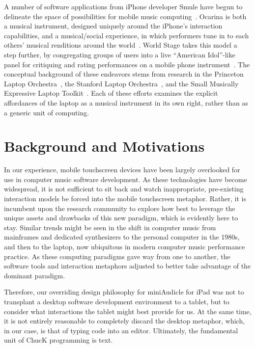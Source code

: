 \documentclass{article}
\begin{document}
A number of software applications from iPhone developer Smule have begun to delineate the space of possibilities for mobile music computing~\cite{wang2009smule}. 
Ocarina is both a musical instrument, designed uniquely around the iPhone's interaction capabilities, and a musical/social experience, in which performers tune in to each others' musical renditions around the world~\cite{wang2014ocarina}. 
World Stage takes this model a step further, by congregating groups of users into a live ``American Idol''-like panel for critiquing and rating performances on a mobile phone instrument~\cite{wang2011world}. 
The conceptual background of these endeavors stems from research in the Princeton Laptop Orchestra~\cite{smallwood2008plork}, the Stanford Laptop Orchestra~\cite{wang2009slork}, and the Small Musically Expressive Laptop Toolkit~\cite{fiebrink2007smelt}.
Each of these efforts examines the explicit affordances of the laptop as a musical instrument in its own right, rather than as a generic unit of computing. 


\section{Background and Motivations}\label{sec:backgroundAndMotivations}

In our experience, mobile touchscreen devices have been largely overlooked for use in computer music software development. 
As these technologies have become widespread, it is not sufficient to sit back and watch inappropriate, pre-existing interaction models be forced into the mobile touchscreen metaphor. 
Rather, it is incumbent upon the research community to explore how best to leverage the unique assets and drawbacks of this new paradigm, which is evidently here to stay. 
Similar trends might be seen in the shift in computer music from mainframes and dedicated synthesizers to the personal computer in the 1980s, and then to the laptop, now ubiquitous in modern computer music performance practice. 
As these computing paradigms gave way from one to another, the software tools and interaction metaphors adjusted to better take advantage of the dominant paradigm. 

Therefore, our overriding design philosophy for miniAudicle for iPad was not to transplant a desktop software development environment to a tablet, but to consider what interactions the tablet might best provide for us. 
At the same time, it is not entirely reasonable to completely discard the desktop metaphor, which, in our case, is that of typing code into an editor. 
Ultimately, the fundamental unit of ChucK programming is text. 
\end{document}
